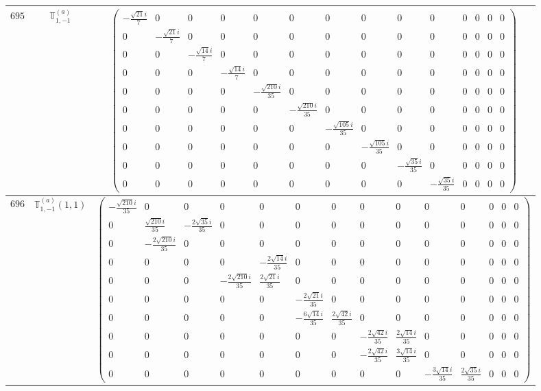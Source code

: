 \documentclass[fleqn,8pt,landscape]{jsarticle}
\begin{document}
\begin{center}
\begin{longtable}{ccc}
$ 695 $ & $ \mathbb{T}_{1,-1}^{(a)} $ & $ \begin{pmatrix} - \frac{\sqrt{21} i}{7} & 0 & 0 & 0 & 0 & 0 & 0 & 0 & 0 & 0 & 0 & 0 & 0 & 0 \\ 0 & - \frac{\sqrt{21} i}{7} & 0 & 0 & 0 & 0 & 0 & 0 & 0 & 0 & 0 & 0 & 0 & 0 \\ 0 & 0 & - \frac{\sqrt{14} i}{7} & 0 & 0 & 0 & 0 & 0 & 0 & 0 & 0 & 0 & 0 & 0 \\ 0 & 0 & 0 & - \frac{\sqrt{14} i}{7} & 0 & 0 & 0 & 0 & 0 & 0 & 0 & 0 & 0 & 0 \\ 0 & 0 & 0 & 0 & - \frac{\sqrt{210} i}{35} & 0 & 0 & 0 & 0 & 0 & 0 & 0 & 0 & 0 \\ 0 & 0 & 0 & 0 & 0 & - \frac{\sqrt{210} i}{35} & 0 & 0 & 0 & 0 & 0 & 0 & 0 & 0 \\ 0 & 0 & 0 & 0 & 0 & 0 & - \frac{\sqrt{105} i}{35} & 0 & 0 & 0 & 0 & 0 & 0 & 0 \\ 0 & 0 & 0 & 0 & 0 & 0 & 0 & - \frac{\sqrt{105} i}{35} & 0 & 0 & 0 & 0 & 0 & 0 \\ 0 & 0 & 0 & 0 & 0 & 0 & 0 & 0 & - \frac{\sqrt{35} i}{35} & 0 & 0 & 0 & 0 & 0 \\ 0 & 0 & 0 & 0 & 0 & 0 & 0 & 0 & 0 & - \frac{\sqrt{35} i}{35} & 0 & 0 & 0 & 0 \end{pmatrix} $ \\ \hline
$ 696 $ & $ \mathbb{T}_{1,-1}^{(a)}(1,1) $ & $ \begin{pmatrix} - \frac{\sqrt{210} i}{35} & 0 & 0 & 0 & 0 & 0 & 0 & 0 & 0 & 0 & 0 & 0 & 0 & 0 \\ 0 & \frac{\sqrt{210} i}{35} & - \frac{2 \sqrt{35} i}{35} & 0 & 0 & 0 & 0 & 0 & 0 & 0 & 0 & 0 & 0 & 0 \\ 0 & - \frac{2 \sqrt{210} i}{35} & 0 & 0 & 0 & 0 & 0 & 0 & 0 & 0 & 0 & 0 & 0 & 0 \\ 0 & 0 & 0 & 0 & - \frac{2 \sqrt{14} i}{35} & 0 & 0 & 0 & 0 & 0 & 0 & 0 & 0 & 0 \\ 0 & 0 & 0 & - \frac{2 \sqrt{210} i}{35} & \frac{2 \sqrt{21} i}{35} & 0 & 0 & 0 & 0 & 0 & 0 & 0 & 0 & 0 \\ 0 & 0 & 0 & 0 & 0 & - \frac{2 \sqrt{21} i}{35} & 0 & 0 & 0 & 0 & 0 & 0 & 0 & 0 \\ 0 & 0 & 0 & 0 & 0 & - \frac{6 \sqrt{14} i}{35} & \frac{2 \sqrt{42} i}{35} & 0 & 0 & 0 & 0 & 0 & 0 & 0 \\ 0 & 0 & 0 & 0 & 0 & 0 & 0 & - \frac{2 \sqrt{42} i}{35} & \frac{2 \sqrt{14} i}{35} & 0 & 0 & 0 & 0 & 0 \\ 0 & 0 & 0 & 0 & 0 & 0 & 0 & - \frac{2 \sqrt{42} i}{35} & \frac{3 \sqrt{14} i}{35} & 0 & 0 & 0 & 0 & 0 \\ 0 & 0 & 0 & 0 & 0 & 0 & 0 & 0 & 0 & - \frac{3 \sqrt{14} i}{35} & \frac{2 \sqrt{35} i}{35} & 0 & 0 & 0 \end{pmatrix} $ \\ \hline

\end{longtable}
\end{center}
\end{document}
